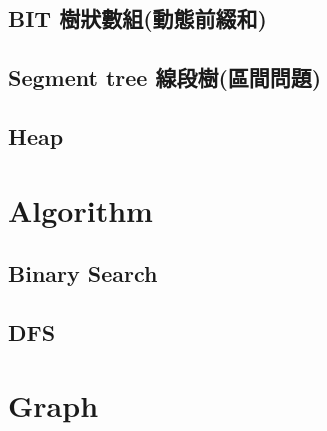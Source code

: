 \subsection{BIT 樹狀數組(動態前綴和)}


\subsection{Segment tree 線段樹(區間問題)}


\subsection{Heap}


%

%

%





\section{Algorithm}

\subsection{Binary Search}


\subsection{DFS}






\section{Graph}

